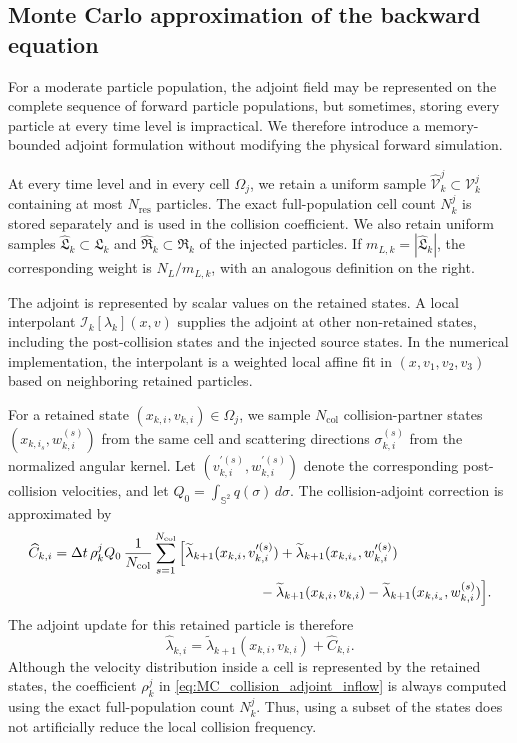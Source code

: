 \documentclass[12pt,nopreprintline]{elsarticle}
\begin{document}
\subsection{Monte Carlo approximation of the backward equation}

For a moderate particle population, the adjoint field may be represented on the complete sequence of forward particle populations, but sometimes, storing every particle at every time level is impractical. We therefore introduce a memory-bounded adjoint formulation without modifying the physical forward simulation.

At every time level and in every cell $\Omega_j$, we retain a uniform sample $\widehat{\mathcal V}_k^j\subset\mathcal V_k^j$ containing at most $N_{\mathrm{res}}$ particles. The exact full-population cell count $N_k^j$ is stored separately and is used in the collision coefficient. We also retain uniform samples $\widehat{\mathfrak L}_k\subset\mathfrak L_k$ and $\widehat{\mathfrak R}_k\subset\mathfrak R_k$ of the injected particles. If $m_{L,k}=|\widehat{\mathfrak L}_k|$, the corresponding weight is $N_L/m_{L,k}$, with an analogous definition on the right.

The adjoint is represented by scalar values on the retained states. A local interpolant $\mathcal I_k[\lambda_k](x,v)$ supplies the adjoint at other non-retained states, including the post-collision states and the injected source states. In the numerical implementation, the interpolant is a weighted local affine fit in $(x,v_1,v_2,v_3)$ based on neighboring retained particles.

For a retained state $(x_{k,i},v_{k,i})\in\Omega_j$, we sample $N_{\mathrm{col}}$ collision-partner states $(x_{k,i_s},w_{k,i}^{(s)})$ from the same cell and scattering directions $\sigma_{k,i}^{(s)}$ from the normalized angular kernel. Let $(v_{k,i}^{\prime(s)},w_{k,i}^{\prime(s)})$ denote the corresponding post-collision velocities, and let
\(
Q_0=\int_{\mathbb S^2}q(\sigma)\,d\sigma
\). The collision-adjoint correction is approximated by
\begin{align}
\widehat C_{k,i}
&=
\Delta t\,\rho_k^j Q_0\,
\frac{1}{N_{\mathrm{col}}}
\sum_{s=1}^{N_{\mathrm{col}}}
\Big[
\widetilde\lambda_{k+1}
(x_{k,i},v_{k,i}^{\prime(s)})
+\widetilde\lambda_{k+1}
(x_{k,i_s},w_{k,i}^{\prime(s)})
\nonumber\\
&\hspace{5.2cm}
-\widetilde\lambda_{k+1}(x_{k,i},v_{k,i})
-\widetilde\lambda_{k+1}(x_{k,i_s},w_{k,i}^{(s)})
\Big].
\label{eq:MC_collision_adjoint_inflow}
\end{align}
The adjoint update for this retained particle is therefore
\begin{equation}
\widehat\lambda_{k,i}
=
\widetilde\lambda_{k+1}(x_{k,i},v_{k,i})
+\widehat C_{k,i}.
\label{eq:reservoir_adjoint_update_inflow}
\end{equation}
Although the velocity distribution inside a cell is represented by the retained states, the coefficient $\rho_k^j$ in
\eqref{eq:MC_collision_adjoint_inflow} is always computed using the exact
full-population count $N_k^j$. Thus, using a subset of the states does not artificially reduce the local collision frequency.
\end{document}
